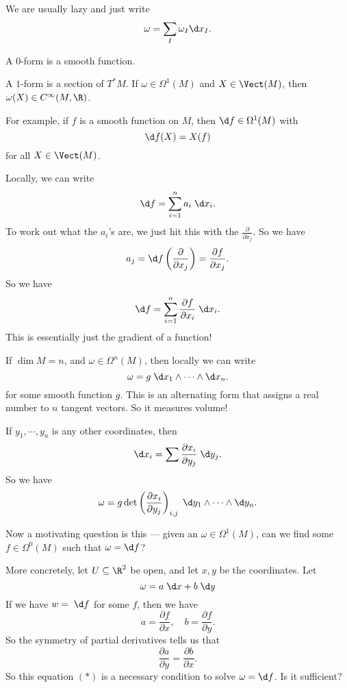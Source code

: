 \documentclass[a4paper]{article}
\begin{document}
We are usually lazy and just write
\[
  \omega = \sum_I \omega_I \d x_I.
\]
\begin{eg}
  A $0$-form is a smooth function.
\end{eg}

\begin{eg}
  A $1$-form is a section of $T^* M$. If $\omega \in \Omega^1(M)$ and $X \in \Vect(M)$, then $\omega(X) \in C^\infty(M, \R)$.

  For example, if $f$ is a smooth function on $M$, then $\d f \in \Omega^1(M)$ with
  \[
    \d f(X) = X(f)
  \]
  for all $X \in \Vect(M)$.

  Locally, we can write
  \[
    \d f = \sum_{i = 1}^n a_i \;\d x_i.
  \]
  To work out what the $a_i$'s are, we just hit this with the $\frac{\partial}{\partial x_j}$. So we have
  \[
    a_j = \d f\left(\frac{\partial}{\partial x_j}\right) = \frac{\partial f}{\partial x_j}.
  \]
  So we have
  \[
    \d f = \sum_{i = 1}^n \frac{\partial f}{\partial x_i}\; \d x_i.
  \]
  This is essentially just the gradient of a function!
\end{eg}

\begin{eg}
  If $\dim M = n$, and $\omega \in \Omega^n(M)$, then locally we can write
  \[
    \omega = g \;\d x_1 \wedge \cdots \wedge \d x_n.
  \]
  for some smooth function $g$. This is an alternating form that assigns a real number to $n$ tangent vectors. So it measures volume!

  If $y_1, \cdots, y_n$ is any other coordinates, then
  \[
    \d x_i = \sum \frac{\partial x_i}{\partial y_j}\; \d y_j.
  \]
  So we have
  \[
    \omega = g \det\left(\frac{\partial x_i}{\partial y_j}\right)_{i, j} \;\d y_1 \wedge \cdots \wedge \d y_n.
  \]
\end{eg}

Now a motivating question is this --- given an $\omega \in \Omega^1(M)$, can we find some $f \in \Omega^0(M)$ such that $\omega = \d f$?

More concretely, let $U \subseteq \R^2$ be open, and let $x, y$ be the coordinates. Let
\[
  \omega = a \;\d x + b\;\d y
\]
If we have $w = \;\d f$ for some $f$, then we have
\[
  a = \frac{\partial f}{\partial x},\quad b = \frac{\partial f}{\partial y}.
\]
So the symmetry of partial derivatives tells us that
\[
  \frac{\partial a}{\partial y} = \frac{\partial b}{\partial x}.\tag{$*$}
\]
So this equation $(*)$ is a necessary condition to solve $\omega = \d f$. Is it sufficient?
\end{document}
